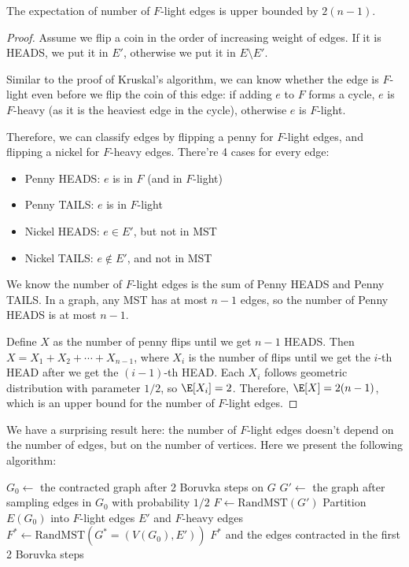 \begin{theorem}
	The expectation of number of $F$-light edges is upper bounded by $2(n-1)$.
\end{theorem}
\begin{proof}
	Assume we flip a coin in the order of increasing weight of edges. If it is HEADS, we put it in $E'$, otherwise we put it in $E\setminus E'$.

	Similar to the proof of Kruskal's algorithm, we can know whether the edge is $F$-light even before we flip the coin of this edge: if adding $e$ to $F$ forms a cycle, $e$ is $F$-heavy (as it is the heaviest edge in the cycle), otherwise $e$ is $F$-light.

	Therefore, we can classify edges by flipping a penny for $F$-light edges, and flipping a nickel for $F$-heavy edges. There're 4 cases for every edge:

	\begin{itemize}
		\item Penny HEADS: $e$ is in $F$ (and in $F$-light)
		\item Penny TAILS: $e$ is in $F$-light
		\item Nickel HEADS: $e\in E'$, but not in MST
		\item Nickel TAILS: $e\not\in E'$, and not in MST
	\end{itemize}

	We know the number of $F$-light edges is the sum of Penny HEADS and Penny TAILS. In a graph, any MST has at most $n-1$ edges, so the number of Penny HEADS is at most $n-1$.

	Define $X$ as the number of penny flips until we get $n-1$ HEADS. Then $X = X_1 + X_2 + \cdots + X_{n-1}$, where $X_i$ is the number of flips until we get the $i$-th HEAD after we get the $(i-1)$-th HEAD. Each $X_i$ follows geometric distribution with parameter $1/2$, so $\E[X_i] = 2$. Therefore, $\E[X] = 2(n-1)$, which is an upper bound for the number of $F$-light edges.
\end{proof}

We have a surprising result here: the number of $F$-light edges doesn't depend on the number of edges, but on the number of vertices. Here we present the following algorithm:

\begin{algorithm}[H]
	\caption{RandMST} \label{alg:randmst}
	$G_0 \gets$ the contracted graph after 2 Boruvka steps on $G$\;
	$G' \gets$ the graph after sampling edges in $G_0$ with probability $1/2$\;
	$F \gets \text{RandMST} (G')$\;
	Partition $E(G_0)$ into $F$-light edges $E'$ and $F$-heavy edges\;
	$F^* \gets \text{RandMST} (G^* = (V(G_0), E'))$\;
	\Return $F^*$ and the edges contracted in the first 2 Boruvka steps\;
\end{algorithm}

